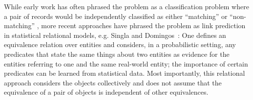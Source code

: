 
While early work has often phrased the problem as a
classification problem where a pair of records would be independently
classified as either ``matching'' or ``non-matching'' \cite{fellegi69linkage}, %
more recent approaches have
phrased the problem as link prediction in statistical relational
models, e.g. Singla and Domingos~\cite{singla06entity}: One defines an
equivalence relation over entities and considers, in a probabilistic
setting, any predicates that state the same things about two entities
as evidence for the entities referring to one and the same real-world
entity; the importance of certain predicates can be learned from
statistical data.  Most importantly, this relational approach
considers the objects collectively and does not assume that the
equivalence of a pair of objects is independent of other
equivalences. \\
